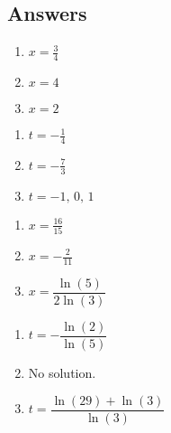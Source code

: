 \newpage

\subsection{Answers}


\begin{multicols}{3}
\begin{enumerate}

\item $x = \frac{3}{4}$
\item $x = 4$
\item $x=2$

\setcounter{HW}{\value{enumi}}
\end{enumerate}
\end{multicols}

\begin{multicols}{3}
\begin{enumerate}
\setcounter{enumi}{\value{HW}}

\item $t = -\frac{1}{4}$
\item $t = -\frac{7}{3}$
\item $t = -1, \, 0, \, 1$

\setcounter{HW}{\value{enumi}}
\end{enumerate}
\end{multicols}

\begin{multicols}{3}
\begin{enumerate}
\setcounter{enumi}{\value{HW}}

\item $x = \frac{16}{15}$
\item $x=-\frac{2}{11}$  
\item $x = \dfrac{\ln(5)}{2\ln(3)}$

\setcounter{HW}{\value{enumi}}
\end{enumerate}
\end{multicols}

\begin{multicols}{3}
\begin{enumerate}
\setcounter{enumi}{\value{HW}}

\item $t = -\dfrac{\ln(2)}{\ln(5)}$
\item No solution. 
\item $t = \dfrac{\ln(29) + \ln(3)}{\ln(3)}$

\setcounter{HW}{\value{enumi}}
\end{enumerate}
\end{multicols}

